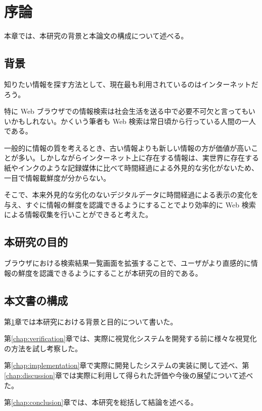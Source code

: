 \chapter{序論}
\label{chap:introduction}

本章では、本研究の背景と本論文の構成について述べる。

\section{背景}

知りたい情報を探す方法として、現在最も利用されているのはインターネットだろう。

特に Web ブラウザでの情報検索は社会生活を送る中で必要不可欠と言ってもいいかもしれない。かくいう筆者も Web 検索は常日頃から行っている人間の一人である。

一般的に情報の質を考えるとき、古い情報よりも新しい情報の方が価値が高いことが多い。しかしながらインターネット上に存在する情報は、実世界に存在する紙やインクのような記録媒体に比べて時間経過による外見的な劣化がないため、一目で情報載鮮度が分からない。

そこで、本来外見的な劣化のないデジタルデータに時間経過による表示の変化を与え、すぐに情報の鮮度を認識できるようにすることでより効率的に Web 検索による情報収集を行いことができると考えた。

\section{本研究の目的}

ブラウザにおける検索結果一覧画面を拡張することで、ユーザがより直感的に情報の鮮度を認識できるようにすることが本研究の目的である。

\section{本文書の構成}

第\ref{chap:introduction}章では本研究における背景と目的について書いた。

第\ref{chap:verification}章では、実際に視覚化システムを開発する前に様々な視覚化の方法を試し考察した。

第\ref{chap:implementation}章で実際に開発したシステムの実装に関して述べ、第\ref{chap:discussion}章では実際に利用して得られた評価や今後の展望について述べた。

第\ref{chap:conclusion}章では、本研究を総括して結論を述べる。
